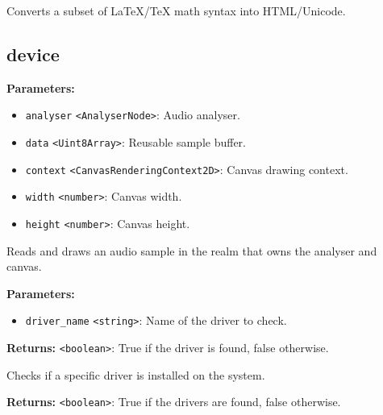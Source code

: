 \documentclass[12pt,a4paper]{article}
\begin{document}
\noindent Converts a subset of LaTeX/TeX math syntax into HTML/Unicode.


\subsection{device}
\vspace{5mm}
\noindent {}


\noindent \textbf{Parameters:}
\begin{itemize}
  \item \texttt{analyser} \texttt{<AnalyserNode>}: Audio analyser.
  \item \texttt{data} \texttt{<Uint8Array>}: Reusable sample buffer.
  \item \texttt{context} \texttt{<CanvasRenderingContext2D>}: Canvas drawing context.
  \item \texttt{width} \texttt{<number>}: Canvas width.
  \item \texttt{height} \texttt{<number>}: Canvas height.
\end{itemize}

\noindent Reads and draws an audio sample in the realm that owns the analyser and canvas.

\vspace{5mm}
\noindent {}


\noindent \textbf{Parameters:}
\begin{itemize}
  \item \texttt{driver\_name} \texttt{<string>}: Name of the driver to check.
\end{itemize}

\noindent \textbf{Returns:} \texttt{<boolean>}: True if the driver is found, false otherwise.

\noindent Checks if a specific driver is installed on the system.

\vspace{5mm}
\noindent {}


\noindent \textbf{Returns:} \texttt{<boolean>}: True if the drivers are found, false otherwise.
\end{document}

